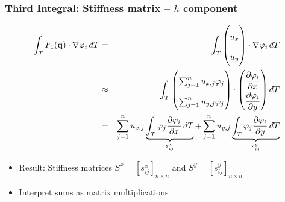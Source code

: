 \documentclass{beamer}
\newcommand{\pd}[2]{\dfrac{\partial #1}{\partial #2}}
\renewcommand{\phi}{\varphi}
\begin{document}
\begin{frame}
  \frametitle{Third Integral: Stiffness matrix -- $h$ component}
  \begin{eqnarray*}
    \int_T F_1(\mathbf{q}) \cdot \nabla \phi_i \, dT & = &
    \int_T
    \begin{pmatrix}
      u_x \\ u_y
    \end{pmatrix}
    \cdot \nabla \phi_i \, dT \\
    & \approx & \int_T
    \begin{pmatrix}
      \sum_{j=1}^n u_{x,j} \phi_j \\
      \sum_{j=1}^n u_{y,j} \phi_j \\
    \end{pmatrix}
    \cdot
    {
      \renewcommand\arraystretch{2}
      \begin{pmatrix}
        \pd{\phi_i}{x} \\
        \pd{\phi_i}{y}
      \end{pmatrix} dT
    }\\
    & = & \sum_{j=1}^n u_{x,j} \underbrace{\int_T \phi_j \pd{\phi_i}{x} \, dT}_{s^x_{ij}} + \sum_{j=1}^n u_{y,j} \underbrace{\int_T \phi_j \pd{\phi_i}{y} \, dT}_{s^y_{ij}}
  \end{eqnarray*}
  \begin{itemize}
  \item Result: Stiffness matrices $S^x = [s_{ij}^x]_{n \times n}$ and $S^y = [s_{ij}^y]_{n \times n}$
  \item Interpret sums as matrix multiplications
  \end{itemize}
\end{frame}
\end{document}

